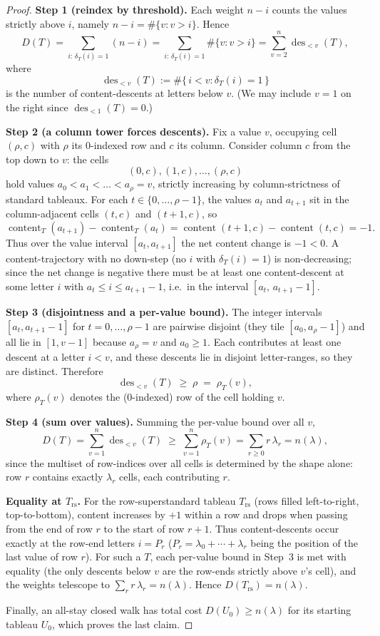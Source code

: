 \documentclass[11pt]{article}
\theoremstyle{plain}
\theoremstyle{remark}
\newcommand{\cont}{\operatorname{content}}
\newcommand{\des}{\operatorname{des}}
\newcommand{\Trs}{T_{\mathrm{rs}}}
\begin{document}
\begin{proof}
\textbf{Step 1 (reindex by threshold).}
Each weight $n-i$ counts the values strictly above $i$, namely
$n-i=\#\{v: v>i\}$. Hence
\[
  D(T)
   =\sum_{i:\,\delta_T(i)=1}(n-i)
   =\sum_{i:\,\delta_T(i)=1}\#\{v:v>i\}
   =\sum_{v=2}^{n}\des_{<v}(T),
\]
where
\[
  \des_{<v}(T):=\#\{\,i<v:\delta_T(i)=1\,\}
\]
is the number of content-descents at letters below $v$. (We may include
$v=1$ on the right since $\des_{<1}(T)=0$.)

\medskip
\textbf{Step 2 (a column tower forces descents).}
Fix a value $v$, occupying cell $(\rho,c)$ with $\rho$ its $0$-indexed row
and $c$ its column. Consider column $c$ from the top down to $v$: the cells
\[
  (0,c),(1,c),\dots,(\rho,c)
\]
hold values $a_0<a_1<\dots<a_\rho=v$, strictly increasing by column-strictness
of standard tableaux. For each $t\in\{0,\dots,\rho-1\}$, the values $a_t$ and
$a_{t+1}$ sit in the column-adjacent cells $(t,c)$ and $(t{+}1,c)$, so
\[
  \cont_T(a_{t+1})-\cont_T(a_t)
   =\cont(t{+}1,c)-\cont(t,c)
   =-1.
\]
Thus over the value interval $[a_t,a_{t+1}]$ the net content change is
$-1<0$. A content-trajectory with no down-step (no $i$ with $\delta_T(i)=1$)
is non-decreasing; since the net change is negative there must be at least
one content-descent at some letter $i$ with $a_t\le i\le a_{t+1}-1$, i.e.\ in
the interval $[a_t,\,a_{t+1}-1]$.

\medskip
\textbf{Step 3 (disjointness and a per-value bound).}
The integer intervals $[a_t,a_{t+1}-1]$ for $t=0,\dots,\rho-1$ are pairwise
disjoint (they tile $[a_0,a_\rho-1]$) and all lie in $[1,v-1]$ because
$a_\rho=v$ and $a_0\ge 1$. Each contributes at least one descent at a letter
$i<v$, and these descents lie in disjoint letter-ranges, so they are
distinct. Therefore
\[
  \des_{<v}(T)\;\ge\;\rho\;=\;\rho_T(v),
\]
where $\rho_T(v)$ denotes the ($0$-indexed) row of the cell holding $v$.

\medskip
\textbf{Step 4 (sum over values).}
Summing the per-value bound over all $v$,
\[
  D(T)=\sum_{v=1}^{n}\des_{<v}(T)\;\ge\;\sum_{v=1}^{n}\rho_T(v)
       =\sum_{r\ge 0} r\,\lambda_r
       =n(\lambda),
\]
since the multiset of row-indices over all cells is determined by the shape
alone: row $r$ contains exactly $\lambda_r$ cells, each contributing $r$.

\medskip
\textbf{Equality at $\Trs$.}
For the row-superstandard tableau $\Trs$ (rows filled left-to-right,
top-to-bottom), content increases by $+1$ within a row and drops when
passing from the end of row $r$ to the start of row $r+1$. Thus
content-descents occur exactly at the row-end letters $i=P_r$
($P_r=\lambda_0+\cdots+\lambda_r$ being the position of the last value of
row $r$). For such a $T$, each per-value bound in Step~3 is met with
equality (the only descents below $v$ are the row-ends strictly above $v$'s
cell), and the weights telescope to $\sum_r r\,\lambda_r=n(\lambda)$.
Hence $D(\Trs)=n(\lambda)$.

Finally, an all-stay closed walk has total cost $D(U_0)\ge n(\lambda)$ for
its starting tableau $U_0$, which proves the last claim.
\end{proof}
\end{document}
